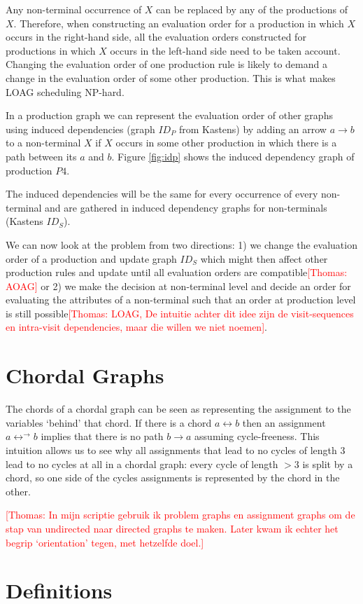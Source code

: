 \documentclass{llncs}
\newif\iffinal\finalfalse
\newcommand{\REM}[3]{\iffinal\else\textcolor{#2}{[#1: #3]}\fi}
\newcommand{\Thomas}[1]{\REM{Thomas}{red}{#1}}
\begin{document}
Any non-terminal occurrence of $X$ can be replaced by any
of the productions of $X$. Therefore, when constructing an evaluation
order for a production in which $X$ occurs in the right-hand side,
all the evaluation orders constructed for productions in which 
$X$ occurs in the left-hand side need to be taken account.
Changing the evaluation order of one production rule is likely to demand 
a change in the evaluation order of some other production. This is 
what makes LOAG scheduling NP-hard.

In a production graph we can represent the evaluation order of other graphs
using induced dependencies (graph $ID_P$ from Kastens) by adding an 
arrow $a\rightarrow b$ to a non-terminal $X$ if $X$ occurs in some other
production in which there is a path between its $a$ and $b$.
Figure \ref{fig:idp} shows the induced dependency graph of production
$P4$.


The induced dependencies will be the same for every occurrence of every
non-terminal and are gathered in induced dependency graphs for 
non-terminals (Kastens $ID_S$).

We can now look at the problem from two directions: 1) we change the
evaluation order of a production and update graph $ID_S$ which might
then affect other production rules and update until all evaluation
orders are compatible\Thomas{AOAG} or 2) we make the decision at non-terminal 
level and decide an order for evaluating the attributes of a non-terminal 
such that an order at production level is still 
possible\Thomas{LOAG, De intuitie achter dit idee zijn de visit-sequences
en intra-visit dependencies, maar die willen we niet noemen}.

\section{Chordal Graphs}
The chords of a chordal graph can be seen as representing the assignment
to the variables `behind' that chord. If there is a chord $a\leftrightarrow b$
then an assignment $a\leftrightarrow^\rightarrow b$ implies that there is 
no path $b\longrightarrow a$ assuming cycle-freeness. This intuition allows
us to see why all assignments that lead to no cycles of length 3 lead to 
no cycles at all in a chordal graph: every cycle of length $> 3$ is 
split by a chord, so one side of the cycles assignments is represented by
the chord in the other.


\Thomas{In mijn scriptie gebruik ik problem graphs en assignment graphs
om de stap van undirected naar directed graphs te maken. Later kwam ik
echter het begrip `orientation' tegen, met hetzelfde doel.}

\section{Definitions}




\end{document}
